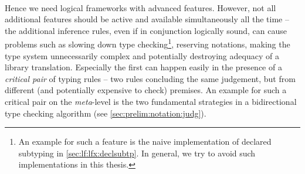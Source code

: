 %

\paragraph{} Hence we need logical frameworks with advanced features. However, not all additional features should be active and available simultaneously all the time -- the additional inference rules, even if in conjunction logically sound, can cause problems such as slowing down type checking\footnote{An example for such a feature is the naive implementation of declared subtyping in \autoref{sec:lf:lfx:declsubtp}. In general, we try to avoid such implementations in this thesis.}, reserving notations, making the type system unnecessarily complex and potentially destroying adequacy of a library translation. Especially the first can happen easily in the presence of a \emph{critical pair} of typing rules -- two rules concluding the same judgement, but from different (and potentially expensive to check) premises. An example for such a critical pair on the \emph{meta}-level is the two fundamental strategies in a bidirectional type checking algorithm (see \autoref{sec:prelim:notation:judg}).

